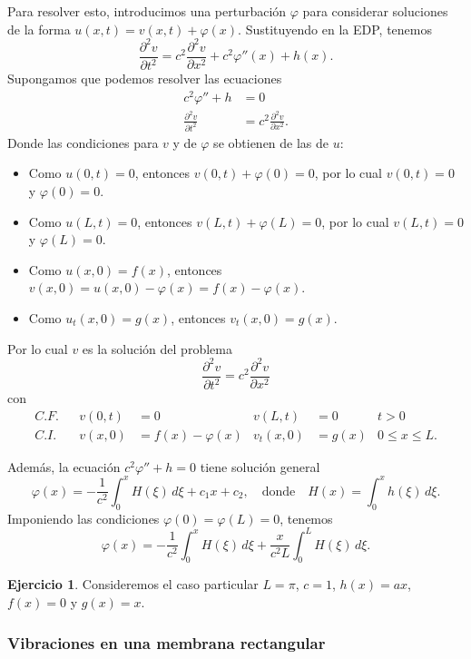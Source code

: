 \documentclass[11pt,letterpaper,draft]{report}
\theoremstyle{plain}
\theoremstyle{definition}
\newtheorem{exercise}[theorem]{Ejercicio}
\theoremstyle{remark}
\newcommand\<{\langle}
\renewcommand\>{\rangle}
\renewcommand\phi\varphi
\begin{document}
Para resolver esto, introducimos una perturbación $\phi$ para
considerar soluciones de la forma $u(x,t)=v(x,t)+\phi(x)$.
Sustituyendo en la EDP, tenemos
\[
  \frac{\partial ^2v}{\partial t^2}
  = c^2 \frac{\partial ^2v}{\partial x^2} + c^2\phi''(x)+ h(x)
.\]
Supongamos que podemos resolver las ecuaciones
\begin{align*}
  c^2\phi''+h &= 0 \\
  \frac{\partial ^2v}{\partial t^2}
  &= c^2 \frac{\partial ^2v}{\partial x^2}.
\end{align*}
Donde las condiciones para $v$ y de $\phi$ se obtienen de las de $u$:
\begin{itemize}
  \item Como $u(0,t) = 0$, entonces $v(0,t)+\phi(0)=0$, por lo cual
    $v(0,t)=0$ y $\phi(0)=0$.
  \item Como $u(L,t)=0$, entonces $v(L,t)+\phi(L)=0$, por lo cual
    $v(L,t)=0$ y $\phi(L)=0$.
  \item Como $u(x,0)=f(x)$, entonces
    $v(x,0)=u(x,0)-\phi(x)=f(x)-\phi(x)$.
  \item Como $u_t(x,0)=g(x)$, entonces $v_t(x,0)=g(x)$.
\end{itemize}
Por lo cual $v$ es la solución del problema
\[
  \frac{\partial ^2v}{\partial t^2}
  = c^2 \frac{\partial ^2v}{\partial x^2}
\]
con
\begin{align*}
  C.F.&& v(0,t)&=0 & v(L,t)&=0 & t>0 \\
  C.I.&& v(x,0)&=f(x)-\phi(x) & v_t(x,0)&=g(x) & 0\leq x\leq L.
\end{align*}

Además, la ecuación $c^2\phi''+h=0$ tiene solución general
\[
  \phi(x) = -\frac{1}{c^2}\int_{0}^{x}H(\xi)\,d\xi+c_1x+c_2,
  \quad \text{donde} \quad H(x) = \int_{0}^{x}h(\xi)\,d\xi
.\]
Imponiendo las condiciones $\phi(0)=\phi(L)=0$, tenemos
\[
  \phi(x)=-\frac{1}{c^{2}}\int_{0}^{x}H(\xi)\,d\xi
  + \frac{x}{c^2L}\int_{0}^{L}H(\xi)\,d\xi
.\]

\begin{exercise}
  Consideremos el caso particular $L=\pi$, $c=1$, $h(x)=ax$, $f(x)=0$
  y $g(x)=x$.
\end{exercise}

\subsubsection{Vibraciones en una membrana rectangular}

\end{document}
